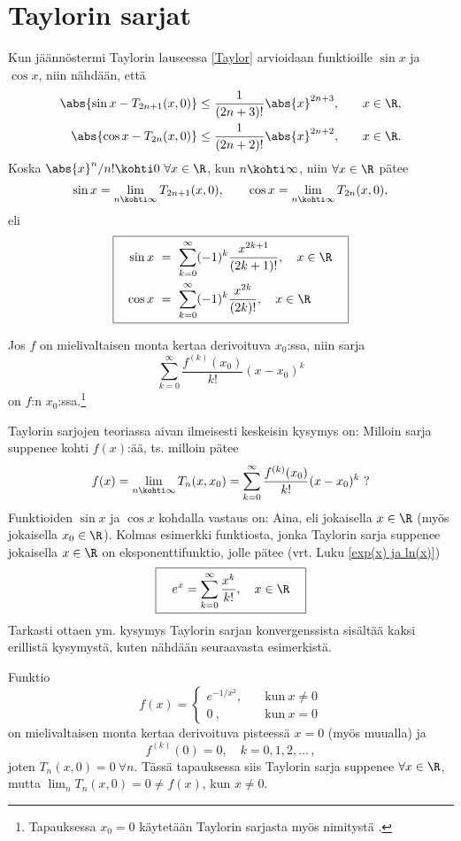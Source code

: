 \section{Taylorin sarjat} \label{taylorin sarjat}
\alku

Kun jäännöstermi Taylorin lauseessa \ref{Taylor} arvioidaan funktioille $\sin x$ ja $\cos x$, 
niin nähdään, että
\begin{alignat*}{2}
\abs{\sin x -T_{2n+1}(x,0)} &\leq \frac{1}{(2n+3)!}\abs{x}^{2n+3},\quad &x\in\R, \\
\abs{\cos x -T_{2n}(x,0)} &\leq \frac{1}{(2n+2)!}\abs{x}^{2n+2},\quad &x\in\R.
\end{alignat*}
Koska $\abs{x}^n/n!\kohti 0 \ \forall x\in\R$, kun $n\kohti\infty$, niin $\forall x\in\R$
pätee
\[ 
\sin x = \lim_{n\kohti\infty} T_{2n+1}(x,0), \qquad \cos x = \lim_{n\kohti\infty}T_{2n}(x,0), 
\] 
eli
\[
\boxed{\begin{aligned}
\quad\sin x\ &=\ \sum_{k=0}^\infty (-1)^k\frac{x^{2k+1}}{(2k+1)!}, \quad x\in\R \quad \\
     \cos x\ &=\ \sum_{k=0}^\infty (-1)^k\frac{x^{2k}}{(2k)!}, \quad x\in\R
\end{aligned}}
\]
\begin{Def}
Jos $f$ on mielivaltaisen monta kertaa derivoituva $x_0$:ssa, niin sarja
\[
\sum_{k=0}^\infty \frac{f^{(k)}(x_0)}{k!}(x-x_0)^k 
\]
on $f$:n  $x_0$:ssa.\footnote[2]{Tapauksessa $x_0=0$ käytetään Taylorin
sarjasta myös nimitystä .}
\end{Def}
Taylorin sarjojen teoriassa aivan ilmeisesti keskeisin kysymys on: Milloin sarja suppenee
kohti $f(x)$:ää, ts. milloin pätee
\[
f(x)=\lim_{n\kohti\infty} T_n(x,x_0)=\sum_{k=0}^\infty \frac{f^{(k)}(x_0)}{k!}(x-x_0)^k \ ?
\]
Funktioiden $\sin x$ ja $\cos x$ kohdalla vastaus on: Aina, eli jokaisella $x\in\R$ 
(myös jokaisella $x_0 \in \R$). Kolmas esimerkki funktiosta, jonka Taylorin sarja suppenee 
jokaisella $x\in\R$ on eksponenttifunktio, jolle pätee (vrt. Luku \ref{exp(x) ja ln(x)})
\[
\boxed{\quad e^x=\sum_{k=0}^\infty \frac{x^k}{k!}, \quad x\in\R \quad}
\]
Tarkasti ottaen ym. kysymys Taylorin sarjan konvergenssista sisältää kaksi erillistä
kysymystä, kuten nähdään seuraavasta esimerkistä.
\begin{Exa} \label{outo Taylorin sarja} Funktio
\[
f(x)=\begin{cases}
e^{-1/x^2}, \quad   &\text{kun}\ x \neq 0 \\
0\ ,                &\text{kun}\ x = 0
\end{cases}
\]
on mielivaltaisen monta kertaa derivoituva pisteessä $x=0$ (myös muualla) ja
\[
f^{(k)}(0)=0,\quad k=0,1,2,\ldots\,,
\]
joten $T_n(x,0)=0 \ \forall n$. Tässä tapauksessa siis Taylorin sarja suppenee $\forall x\in\R$,
mutta $\lim_n T_n(x,0) = 0 \neq f(x)$, kun $x \neq 0 $. \loppu
\end{Exa}
